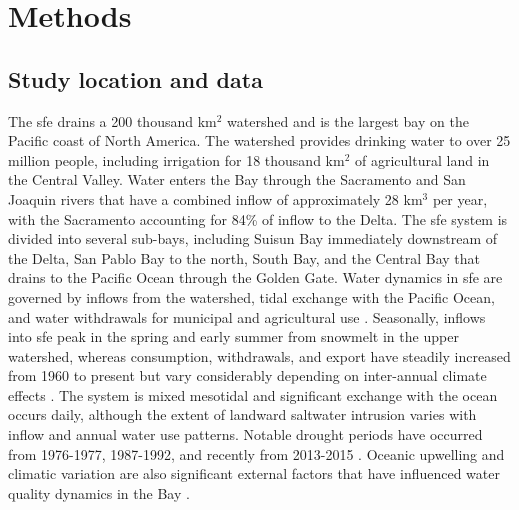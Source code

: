 \documentclass[letterpaper,12pt,oneside]{article}\usepackage[]{graphicx}\usepackage[]{color}
\begin{document}
\section{Methods}

\subsection{Study location and data}

The \ac{sfe} drains a 200 thousand km$^2$ watershed and is the largest bay on the Pacific coast of North America.  The watershed provides drinking water to over 25 million people, including irrigation for 18 thousand km$^2$ of agricultural land in the Central Valley.  Water enters the Bay through the Sacramento and San Joaquin rivers that have a combined inflow of approximately 28 km$^3$ per year, with the Sacramento accounting for 84\% of inflow to the Delta.  The \ac{sfe} system is divided into several sub-bays, including Suisun Bay immediately downstream of the Delta, San Pablo Bay to the north, South Bay, and the Central Bay that drains to the Pacific Ocean through the Golden Gate.  Water dynamics in \ac{sfe} are governed by inflows from the watershed, tidal exchange with the Pacific Ocean, and water withdrawals for municipal and agricultural use \citep{Jassby00}.  Seasonally, inflows into \ac{sfe} peak in the spring and early summer from snowmelt in the upper watershed, whereas consumption, withdrawals, and export have steadily increased from 1960 to present but vary considerably depending on inter-annual climate effects \citep{Cloern12b}.  The system is mixed mesotidal and significant exchange with the ocean occurs daily, although the extent of landward saltwater intrusion varies with inflow and annual water use patterns. Notable drought periods have occurred from 1976-1977, 1987-1992, and recently from 2013-2015 \citep{Cloern15}.  Oceanic upwelling and climatic variation are also significant external factors that have influenced water quality dynamics in the Bay \citep{Cloern07}.
\end{document}
